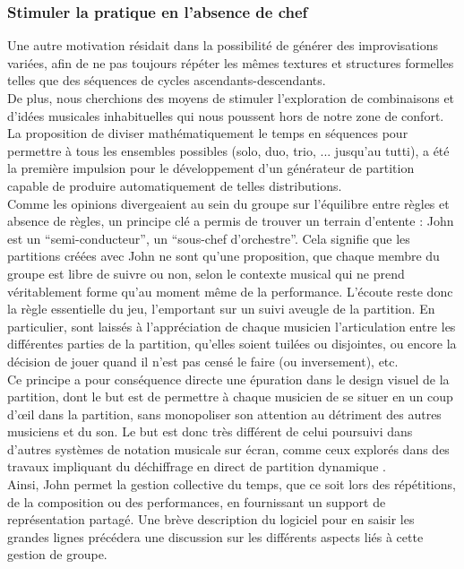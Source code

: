 \subsubsection{Stimuler la pratique en l'absence de chef}

\noindent Une autre motivation résidait dans la possibilité de générer des improvisations variées, afin de ne pas toujours répéter les mêmes textures et structures formelles telles que des séquences de cycles ascendants-descendants.\\
\indent De plus, nous cherchions des moyens de stimuler l'exploration de combinaisons et d'idées musicales inhabituelles qui nous poussent hors de notre zone de confort. La proposition de diviser mathématiquement le temps en séquences pour permettre à tous les ensembles possibles (solo, duo, trio, ... jusqu'au tutti), a été la première impulsion pour le développement d'un générateur de partition capable de produire automatiquement de telles distributions.\\
\indent Comme les opinions divergeaient au sein du groupe sur l'équilibre entre règles et absence de règles, un principe clé a permis de trouver un terrain d'entente : John est un ``semi-conducteur'', un ``sous-chef d'orchestre''. Cela signifie que les partitions créées avec John ne sont qu'une proposition, que chaque membre du groupe est libre de suivre ou non, selon le contexte musical qui ne prend véritablement forme qu'au moment même de la performance. L'écoute reste donc la règle essentielle du jeu, l'emportant sur un suivi aveugle de la partition. En particulier, sont laissés à l'appréciation de chaque musicien l'articulation entre les différentes parties de la partition, qu'elles soient tuilées ou disjointes, ou encore la décision de jouer quand il n'est pas censé le faire (ou inversement), etc.\\
\indent Ce principe a pour conséquence directe une épuration dans le design visuel de la partition, dont le but est de permettre à chaque musicien de se situer en un coup d'œil dans la partition, sans monopoliser son attention au détriment des autres musiciens et du son. Le but est donc très différent de celui poursuivi dans d'autres systèmes de notation musicale sur écran, comme ceux explorés dans des travaux impliquant du déchiffrage en direct de partition dynamique \cite{freeman_extreme_2008}.\\
\indent Ainsi, John permet la gestion collective du temps, que ce soit lors des répétitions, de la composition ou des performances, en fournissant un support de représentation partagé. Une brève description du logiciel pour en saisir les grandes lignes précédera une discussion sur les différents aspects liés à cette gestion de groupe.

